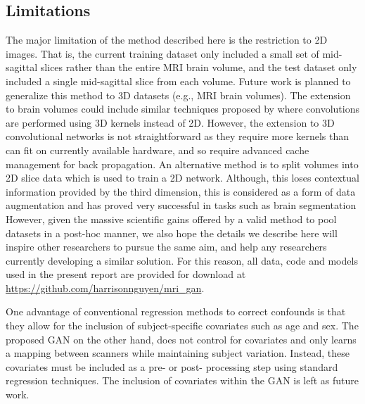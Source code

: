 \subsection{Limitations}
The major limitation of the method described here is the restriction to 2D images. That is, the current training dataset only included a small set of mid-sagittal slices rather than the entire MRI brain volume, and the test dataset only included a single mid-sagittal slice from each volume. Future work is planned to generalize this method to 3D datasets (e.g., MRI brain volumes). The extension to brain volumes could include similar techniques proposed by \cite{wu2016learning} where convolutions are performed using 3D kernels instead of 2D. However, the extension to 3D convolutional networks is not straightforward as they require more kernels than can fit on currently available hardware, and so require advanced cache management for back propagation. An alternative method is to split volumes into 2D slice data which is used to train a 2D network. Although, this loses contextual information provided by the third dimension, this is considered as a form of data augmentation and has proved very successful in tasks such as brain segmentation \citep{gonzalez2016review} However, given the massive scientific gains offered by a valid method to pool datasets in a post-hoc manner, we also hope the details we describe here will inspire other researchers to pursue the same aim, and help any  researchers currently developing a similar solution. For this reason, all data, code and models used in the present report are provided for download at  \url{https://github.com/harrisonnguyen/mri_gan}.

One advantage of conventional regression methods to correct confounds is that they allow for the inclusion of subject-specific covariates such as age and sex. The proposed GAN on the other hand, does not control for covariates and only learns a mapping between scanners while maintaining subject variation. Instead, these covariates must be included as a pre- or post- processing step using standard regression techniques. The inclusion of covariates within the GAN is left as future work.
